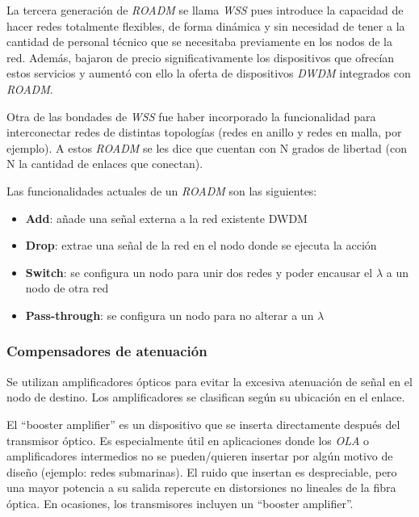 La tercera generación de \emph{ROADM} se llama \emph{WSS} pues
introduce la capacidad de hacer redes totalmente flexibles, de forma
dinámica y sin necesidad de tener a la cantidad de personal técnico
que se necesitaba previamente en los nodos de la red. Además, bajaron
de precio significativamente los dispositivos que ofrecían estos
servicios y aumentó con ello la oferta de dispositivos \emph{DWDM}
integrados con \emph{ROADM}.

Otra de las bondades de \emph{WSS} fue haber incorporado la
funcionalidad para interconectar redes de distintas topologías (redes
en anillo y redes en malla, por ejemplo). A estos \emph{ROADM} se les
dice que cuentan con N grados de libertad (con N la cantidad de
enlaces que conectan).


Las funcionalidades actuales de un \emph{ROADM} son las siguientes:
\begin{itemize}
\item \textbf{Add}: añade una señal externa a la red existente DWDM
\item \textbf{Drop}: extrae una señal de la red en el nodo donde se ejecuta la
  acción
\item \textbf{Switch}: se configura un nodo para unir dos redes y poder
  encausar el $\lambda$ a un nodo de otra red
\item \textbf{Pass-through}: se configura un nodo para no alterar a un
  $\lambda$
\end{itemize}

\subsubsection{Compensadores de atenuación}
\label{sec:amplificadores}


Se utilizan amplificadores ópticos para evitar la excesiva atenuación
de señal en el nodo de destino. Los amplificadores se clasifican según
su ubicación en el enlace.

El ``booster amplifier'' es un dispositivo que se inserta directamente
después del transmisor óptico. Es especialmente útil en aplicaciones
donde los \emph{OLA} o amplificadores intermedios no se pueden/quieren
insertar por algún motivo de diseño (ejemplo: redes submarinas). El
ruido que insertan es despreciable, pero una mayor potencia a su
salida repercute en distorsiones no lineales de la fibra óptica. En
ocasiones, los transmisores incluyen un ``booster amplifier''.

